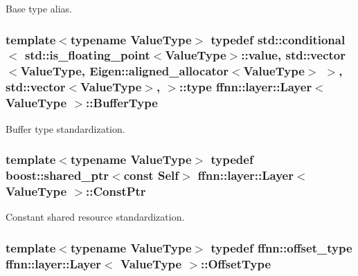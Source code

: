 Base type alias. 

\hypertarget{classffnn_1_1layer_1_1_layer_ad9cab24dbd0cbed2febed5b635f81722}{
\subsubsection[{Buffer\-Type}]{\setlength{\rightskip}{0pt plus 5cm}template$<$typename Value\-Type$>$ typedef std\-::conditional$<$ std\-::is\-\_\-floating\-\_\-point$<$Value\-Type$>$\-::value, std\-::vector$<$Value\-Type, Eigen\-::aligned\-\_\-allocator$<$Value\-Type$>$ $>$, std\-::vector$<$Value\-Type$>$, $>$\-::type {\bf ffnn\-::layer\-::\-Layer}$<$ Value\-Type $>$\-::{\bf Buffer\-Type}}}\label{classffnn_1_1layer_1_1_layer_ad9cab24dbd0cbed2febed5b635f81722}


Buffer type standardization. 

\hypertarget{classffnn_1_1layer_1_1_layer_ad7c9ea196243e78b9c1e4a3a1a17988b}{
\subsubsection[{Const\-Ptr}]{\setlength{\rightskip}{0pt plus 5cm}template$<$typename Value\-Type$>$ typedef boost\-::shared\-\_\-ptr$<$const {\bf Self}$>$ {\bf ffnn\-::layer\-::\-Layer}$<$ Value\-Type $>$\-::{\bf Const\-Ptr}}}\label{classffnn_1_1layer_1_1_layer_ad7c9ea196243e78b9c1e4a3a1a17988b}


Constant shared resource standardization. 

\hypertarget{classffnn_1_1layer_1_1_layer_a2130560f43788898079b7c5c01fb94c8}{
\subsubsection[{Offset\-Type}]{\setlength{\rightskip}{0pt plus 5cm}template$<$typename Value\-Type$>$ typedef {\bf ffnn\-::offset\-\_\-type} {\bf ffnn\-::layer\-::\-Layer}$<$ Value\-Type $>$\-::{\bf Offset\-Type}}}\label{classffnn_1_1layer_1_1_layer_a2130560f43788898079b7c5c01fb94c8}


